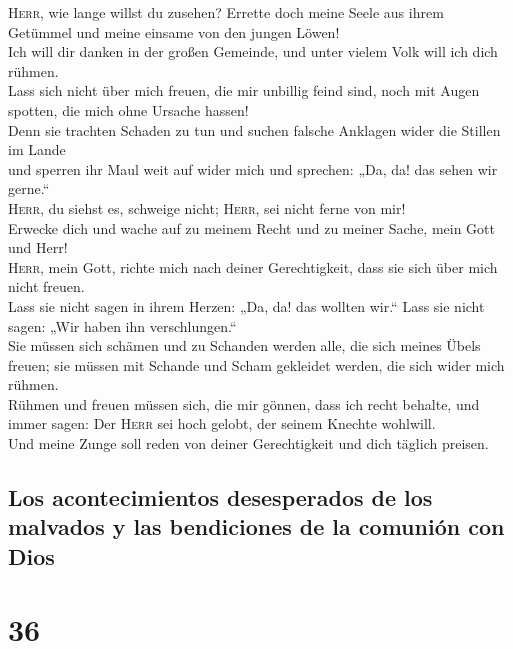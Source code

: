  \textsc{Herr}, wie lange willst du zusehen? Errette doch
meine Seele aus ihrem Getümmel und meine einsame von den jungen Löwen!\\
 Ich will dir danken in der großen Gemeinde, und unter
vielem Volk will ich dich rühmen.\\
 Lass sich nicht über mich freuen, die mir unbillig feind
sind, noch mit Augen spotten, die mich ohne Ursache hassen!\\
 Denn sie trachten Schaden zu tun und suchen falsche
Anklagen wider die Stillen im Lande\\
 und sperren ihr Maul weit auf wider mich und sprechen:
„Da, da! das sehen wir gerne.``\\
 \textsc{Herr}, du siehst es, schweige nicht;
\textsc{Herr}, sei nicht ferne von mir!\\
 Erwecke dich und wache auf zu meinem Recht und zu meiner
Sache, mein Gott und Herr!\\
 \textsc{Herr}, mein Gott, richte mich nach deiner
Gerechtigkeit, dass sie sich über mich nicht freuen.\\
 Lass sie nicht sagen in ihrem Herzen: „Da, da! das
wollten wir.`` Lass sie nicht sagen: „Wir haben ihn verschlungen.``\\
 Sie müssen sich schämen und zu Schanden werden alle, die
sich meines Übels freuen; sie müssen mit Schande und Scham gekleidet
werden, die sich wider mich rühmen.\\
 Rühmen und freuen müssen sich, die mir gönnen, dass ich
recht behalte, und immer sagen: Der \textsc{Herr} sei hoch gelobt, der
seinem Knechte wohlwill.\\
 Und meine Zunge soll reden von deiner Gerechtigkeit und
dich täglich preisen.

\hypertarget{los-acontecimientos-desesperados-de-los-malvados-y-las-bendiciones-de-la-comuniuxf3n-con-dios}{%
\subsection{Los acontecimientos desesperados de los malvados y las
bendiciones de la comunión con
Dios}\label{los-acontecimientos-desesperados-de-los-malvados-y-las-bendiciones-de-la-comuniuxf3n-con-dios}}

\hypertarget{section-35}{%
\section{36}\label{section-35}}

